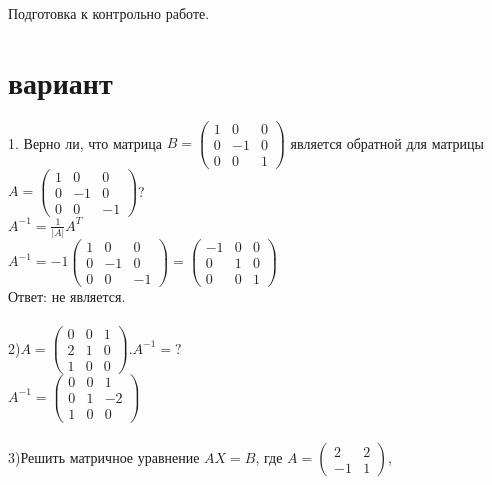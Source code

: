 \documentclass[a4paper]{article}
\begin{document}
    \begin{center} 
        \LARGE Подготовка к контрольно работе.\\
    \end{center}
    \newpage
    \section{вариант}
    1. Верно ли, что матрица 
    $B=\begin{pmatrix}
        1&0&0\\
        0&-1&0\\
        0&0&1
    \end{pmatrix}$
    является обратной для матрицы
    $A=\begin{pmatrix}
        1&0&0\\
        0&-1&0\\
        0&0&-1
    \end{pmatrix}$?\\
    $A^{-1}=\frac{1}{|A|}A^T$\\
    $A^{-1}=-1
    \begin{pmatrix}
        1&0&0\\
        0&-1&0\\
        0&0&-1
    \end{pmatrix}=
    \begin{pmatrix}
        -1&0&0\\
        0&1&0\\
        0&0&1
    \end{pmatrix}$\\
    Ответ: не является.\\\\
    2)$A=\begin{pmatrix}
        0&0&1\\
        2&1&0\\
        1&0&0
    \end{pmatrix}.A^{-1}=?$\\
    $A^{-1}=
    \begin{pmatrix}
        0   &0  &1\\
        0   &1  &-2\\
        1   &0  &0
    \end{pmatrix}$\\\\
    3)Решить матричное уравнение $AX=B$, где
    $A=\begin{pmatrix}
        2&2\\
        -1&1
    \end{pmatrix}$,
\end{document}
